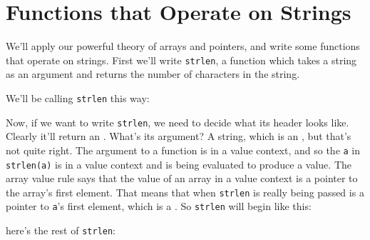 \section{Functions that Operate on Strings}

We'll apply our powerful theory of arrays and pointers, and write some
functions that operate on strings.  First we'll write {\tt strlen}, a
function which takes a string as an argument and returns the number of
characters in the string.  

We'll be calling {\tt strlen} this way:
\begin{flushleft}
\verb% char a[] = "Jean Ogrinz";% \\*
\verb% int length; % \\*
\verb% % \\*
\verb% length = strlen(a);% \\*
\verb% % \\*
\end{flushleft}

Now, if we want to write {\tt strlen}, we need to decide what its header
looks like.  Clearly it'll return an \int.  What's its argument?  A
string, which is an \ao\Char, but that's not quite right.  The argument
to a function is in a value context, and so the {\tt a} in {\tt
strlen(a)} is in a value context and is being evaluated to produce a
value.  The array value rule says that the value of an array in a value
context is a pointer to the array's first element.  That means that when
{\tt strlen} is really being passed is a pointer to {\tt a}'s first
element, which is a \Char.  So {\tt strlen} will begin like this:

\begin{flushleft}
\verb% int strlen(char *s)% \\*
\end{flushleft}

here's the rest of {\tt strlen}:

\begin{flushleft}
\verb% int strlen(char *s)% \\*
\verb% { % \\*
\verb%   int i = 0; % \\*
\verb%  % \\*
\verb%   while (*s != '\0') { % \\*
\verb%     i++; % \\*
\verb%     s++;      /*% Make $s$ point to the next character \verb%*/ % \\*
\verb%   } % \\*
\verb%  % \\*
\verb%   return i; % \\*
\verb% } % 
\end{flushleft}

